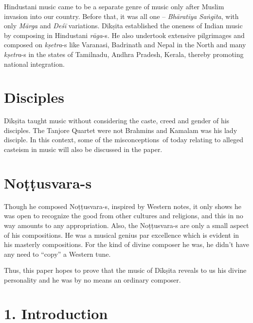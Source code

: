 Hindustani music came to be a separate genre of music only after Muslim invasion into our country. Before that, it was all one – \textit{Bhāratīya Saṅgīta}, with only \textit{Mārga} and \textit{Deśī} variations. Dīkṣita established the oneness of Indian music by composing in Hindustani \textit{rāga}-s. He also undertook extensive pilgrimages and composed on \textit{kṣetra}-s like Varanasi, Badrinath and Nepal in the North and many \textit{kṣetra}-s in the states of Tamilnadu, Andhra Pradesh, Kerala, thereby promoting national integration.

\vspace{-.3cm}

\section*{Disciples}

Dīkṣita taught music without considering the caste, creed and gender of his disciples. The Tanjore Quartet were not Brahmins and Kamalam was his lady disciple. In this context, some of the misconceptions of today relating to alleged casteism in music will also be discussed in the paper.

\vspace{-.3cm}

\section*{Noṭṭusvara-s}

Though he composed Noṭṭusvara-s, inspired by Western notes, it only shows he was open to recognize the good from other cultures and religions, and this in no way amounts to any appropriation. Also, the Noṭṭusvara-s are only a small aspect of his compositions. He was a musical genius par excellence which is evident in his masterly compositions. For the kind of divine composer he was, he didn’t have any need to “copy” a Western tune.

Thus, this paper hopes to prove that the music of Dīkṣita reveals to us his divine personality and he was by no means an ordinary composer.

\vspace{-.3cm}

\section*{1. Introduction}

